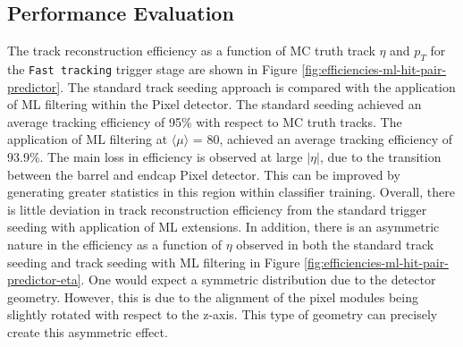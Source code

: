 



\subsection{Performance Evaluation}

The track reconstruction efficiency as a function of MC truth track $\eta$ and $p_T$ for the \texttt{Fast tracking} trigger stage are shown in Figure \ref{fig:efficiencies-ml-hit-pair-predictor}. The standard track seeding approach is compared with the application of ML filtering within the Pixel detector. The standard seeding achieved an average tracking efficiency of 95\% with respect to MC truth tracks. The application of ML filtering at $\langle \mu \rangle$ = 80, achieved an average tracking efficiency of 93.9\%. The main loss in efficiency is observed at large $\lvert \eta \rvert$, due to the transition between the barrel and endcap Pixel detector. This can be improved by generating greater statistics in this region within classifier training. Overall, there is little deviation in track reconstruction efficiency from the standard trigger seeding with application of ML extensions. In addition, there is an asymmetric nature in the efficiency as a function of $\eta$ observed in both the standard track seeding and track seeding with ML filtering in Figure \ref{fig:efficiencies-ml-hit-pair-predictor-eta}. One would expect a symmetric distribution due to the detector geometry. However, this is due to the alignment of the pixel modules being slightly rotated with respect to the z-axis. This type of geometry can precisely create this asymmetric effect.



